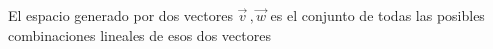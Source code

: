 \documentclass[preview]{standalone}
\begin{document}
\begin{center}
El espacio generado por dos vectores $\vec{v} \, , \vec{w}$ es el conjunto de todas las posibles combinaciones lineales de esos dos vectores
\end{center}
\end{document}
